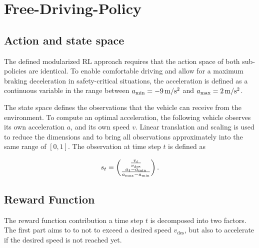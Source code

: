 \documentclass[review]{elsarticle}
\providecommand{\green}[1]{\textcolor{green}{#1}}
\providecommand{\martinc}[1]{\green{[#1]}} %
\providecommand{\sub}[1]{_{\mathrm{#1}}}  %
\providecommand{\3}{{\ss}}
\begin{document}
  
  



\section{Free-Driving-Policy}
\subsection{Action and state space}
\label{actionSpace1}
 The defined modularized RL approach requires that the action space of both sub-policies are identical. To enable comfortable driving and allow for a maximum braking deceleration in safety-critical
situations, the acceleration is defined as a continuous variable in the
  range between $a\sub{\rm min} = \unit[-9]{m/s^2}$ and $a\sub{\rm max} =\unit[2]{m/s^2}$.



The state space defines the observations that the 
vehicle can receive from the environment. To compute an optimal
acceleration, the following vehicle observes its own acceleration $a$,
and its own speed $v$. Linear translation and scaling is used to reduce the dimensions and to bring all observations approximately into the same range of $[0,1]$. The observation at time step $t$ is defined as

\begin{equation}
s_t = \begin{pmatrix} \frac{v_t}{v\sub{des}} \\ \frac{a_t-a\sub{\rm min}}{a\sub{\rm max} - a\sub{\rm min}}\end{pmatrix}.
\end{equation}
\subsection{Reward Function}
\label{rewardFunction}
The reward function contribution a time step $t$ is decomposed into two factors. The first part aims to
to not to exceed a desired speed $v\sub{des}$, but also to accelerate if the desired speed is not reached yet.  
\end{document}
